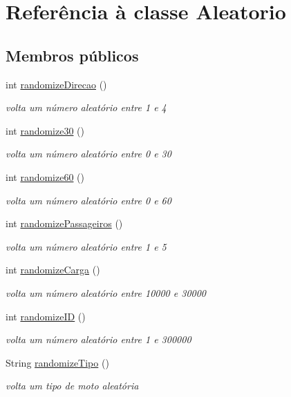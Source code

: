 \hypertarget{class_aleatorio}{}\section{Referência à classe Aleatorio}
\label{class_aleatorio}
\subsection*{Membros públicos}
\begin{DoxyCompactItemize}
\item 
int \mbox{\hyperlink{class_aleatorio_ae502842e6db3781764f96455e8ae943d}{randomize\+Direcao}} ()
\begin{DoxyCompactList}\small\item\em volta um número aleatório entre 1 e 4 \end{DoxyCompactList}\item 
int \mbox{\hyperlink{class_aleatorio_abe19d3fdd490cbe1c2122c1ac3fde341}{randomize30}} ()
\begin{DoxyCompactList}\small\item\em volta um número aleatório entre 0 e 30 \end{DoxyCompactList}\item 
int \mbox{\hyperlink{class_aleatorio_aa0ed910c0a9988620f962c62bd714367}{randomize60}} ()
\begin{DoxyCompactList}\small\item\em volta um número aleatório entre 0 e 60 \end{DoxyCompactList}\item 
int \mbox{\hyperlink{class_aleatorio_a75294eb03a9c18a067f0223b505e4832}{randomize\+Passageiros}} ()
\begin{DoxyCompactList}\small\item\em volta um número aleatório entre 1 e 5 \end{DoxyCompactList}\item 
int \mbox{\hyperlink{class_aleatorio_a2a4832bca1561b9c4b47a28427599607}{randomize\+Carga}} ()
\begin{DoxyCompactList}\small\item\em volta um número aleatório entre 10000 e 30000 \end{DoxyCompactList}\item 
int \mbox{\hyperlink{class_aleatorio_acbb799a34376c65decd5f3a0956420d6}{randomize\+ID}} ()
\begin{DoxyCompactList}\small\item\em volta um número aleatório entre 1 e 300000 \end{DoxyCompactList}\item 
String \mbox{\hyperlink{class_aleatorio_aaa35a5ed7a2a6696fadfad7181392fb8}{randomize\+Tipo}} ()
\begin{DoxyCompactList}\small\item\em volta um tipo de moto aleatória \end{DoxyCompactList}\end{DoxyCompactItemize}
